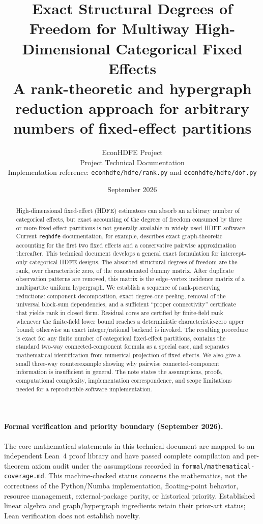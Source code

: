 \documentclass[11pt]{article}
\title{\textbf{Exact Structural Degrees of Freedom for Multiway High-Dimensional Categorical Fixed Effects}\\
\large A rank-theoretic and hypergraph reduction approach for arbitrary numbers of fixed-effect partitions}
\author{EconHDFE Project\\[2pt]\small Project Technical Documentation\\[2pt]\small Implementation reference: \texttt{econhdfe/hdfe/rank.py} and \texttt{econhdfe/hdfe/dof.py}}
\date{September 2026}
\theoremstyle{definition}
\newcommand{\1}{\mathbf{1}}
\begin{document}
\maketitle

\begin{abstract}
High-dimensional fixed-effect (HDFE) estimators can absorb an arbitrary number of categorical effects, but exact accounting of the degrees of freedom consumed by three or more fixed-effect partitions is not generally available in widely used HDFE software. Current \texttt{reghdfe} documentation, for example, describes exact graph-theoretic accounting for the first two fixed effects and a conservative pairwise approximation thereafter. This technical document develops a general exact formulation for intercept-only categorical HDFE designs. The absorbed structural degrees of freedom are the rank, over characteristic zero, of the concatenated dummy matrix. After duplicate observation patterns are removed, this matrix is the edge--vertex incidence matrix of a multipartite uniform hypergraph. We establish a sequence of rank-preserving reductions: component decomposition, exact degree-one peeling, removal of the universal block-sum dependencies, and a sufficient ``proper connectivity'' certificate that yields rank in closed form. Residual cores are certified by finite-field rank whenever the finite-field lower bound reaches a deterministic characteristic-zero upper bound; otherwise an exact integer/rational backend is invoked. The resulting procedure is exact for any finite number of categorical fixed-effect partitions, contains the standard two-way connected-component formula as a special case, and separates mathematical identification from numerical projection of fixed effects. We also give a small three-way counterexample showing why pairwise connected-component information is insufficient in general. The note states the assumptions, proofs, computational complexity, implementation correspondence, and scope limitations needed for a reproducible software implementation.
\end{abstract}

\paragraph{Formal verification and priority boundary (September 2026).}
The core mathematical statements in this technical document are mapped to an independent
Lean~4 proof library and have passed complete compilation and per-theorem axiom
audit under the assumptions recorded in
\texttt{formal/mathematical-coverage.md}. This machine-checked status concerns
the mathematics, not the correctness of the Python/Numba implementation,
floating-point behavior, resource management, external-package parity, or
historical priority. Established linear algebra and graph/hypergraph ingredients
retain their prior-art status; Lean verification does not establish novelty.
\end{document}
